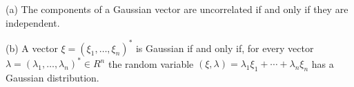 (a) The components of a Gaussian vector are uncorrelated if and only if they are independent.

(b) A vector $\xi = (\xi_1, \ldots, \xi_n)^*$ is Gaussian if and only if, for every vector $\lambda = (\lambda_1, \ldots, \lambda_n)^* \in R^n$ the random variable $(\xi, \lambda) = \lambda_1 \xi_1 + \cdots + \lambda_n \xi_n$ has a Gaussian distribution.
